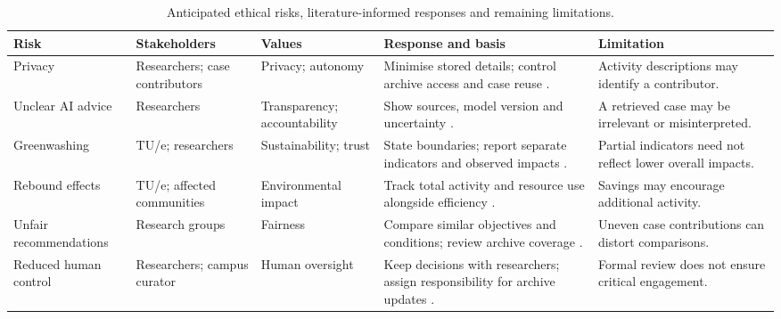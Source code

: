 \documentclass[11pt,a4paper]{article}
\renewcommand{\arraystretch}{1.15}
\begin{document}
\begin{table}[!htbp]
\centering
\footnotesize
\setlength{\tabcolsep}{4pt}
\renewcommand{\arraystretch}{1.35}
\begin{tabularx}{\textwidth}{@{}>{\raggedright\arraybackslash}p{}>{\raggedright\arraybackslash}p{}>{\raggedright\arraybackslash}p{}>{\raggedright\arraybackslash}X>{\raggedright\arraybackslash}p{}@{}}
\toprule
Risk & Stakeholders & Values & Response and basis & Limitation \\
\midrule
Privacy & Researchers; case contributors & Privacy; autonomy & Minimise stored details; control archive access and case reuse \citep{hasselbalch2025sustainability}. & Activity descriptions may identify a contributor. \\
\midrule
Unclear AI advice & Researchers & Transparency; accountability & Show sources, model version and uncertainty \citep{lacoste2019carbon}. & A retrieved case may be irrelevant or misinterpreted. \\
\midrule
Greenwashing & TU/e; researchers & Sustainability; trust & State boundaries; report separate indicators and observed impacts \citep{lin2023cost}. & Partial indicators need not reflect lower overall impacts. \\
\midrule
Rebound effects & TU/e; affected communities & Environmental impact & Track total activity and resource use alongside efficiency \citep{luccioni2025rebound}. & Savings may encourage additional activity. \\
\midrule
Unfair recommendations & Research groups & Fairness & Compare similar objectives and conditions; review archive coverage \citep{hasselbalch2025sustainability}. & Uneven case contributions can distort comparisons. \\
\midrule
Reduced human control & Researchers; campus curator & Human oversight & Keep decisions with researchers; assign responsibility for archive updates \citep{santoni2018control}. & Formal review does not ensure critical engagement. \\
\bottomrule
\end{tabularx}
\caption{Anticipated ethical risks, literature-informed responses and remaining limitations.}
\label{tab:ethical-risks}
\end{table}

\end{document}
